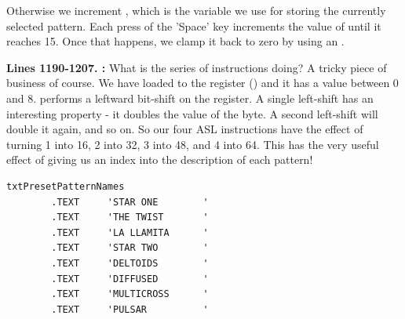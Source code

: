 Otherwise we increment , which is the variable we use for storing the currently selected pattern.
Each press of the 'Space' key increments the value of  until it reaches 15. Once that happens, we 
clamp it back to zero by using an .

\textbf{Lines 1190-1207. :} What is the series of  instructions doing? A tricky
piece of business of course. We have loaded  to the  register () and it has a value between 0 and 8.
 performs a leftward bit-shift on the  register. A single left-shift has an interesting property - it doubles the
value of the byte. A second left-shift will double it again, and so on. So our four {ASL} instructions have the effect of turning 1 into
16, 2 into 32, 3 into 48, and 4 into 64. This has the very useful effect of giving us an index into the description of each pattern!

\begin{lstlisting}[escapechar=\%]
txtPresetPatternNames
        .TEXT     'STAR ONE        '
        .TEXT     'THE TWIST       '
        .TEXT     'LA LLAMITA      '
        .TEXT     'STAR TWO        '
        .TEXT     'DELTOIDS        '
        .TEXT     'DIFFUSED        '
        .TEXT     'MULTICROSS      '
        .TEXT     'PULSAR          '
\end{lstlisting}

